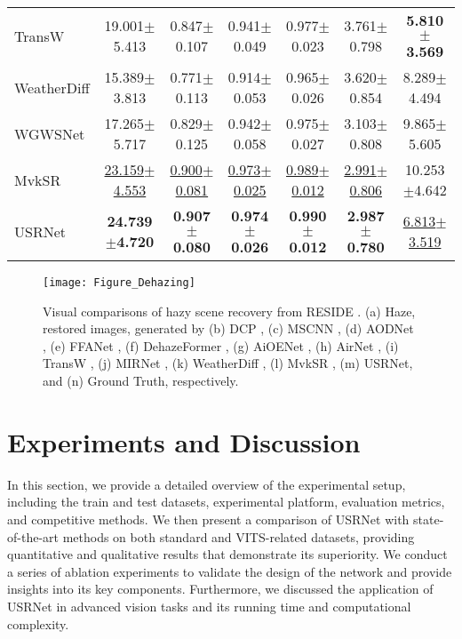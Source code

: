 \documentclass[final,12pt]{elsarticle}
\begin{document}
\begin{table}[t]
\begin{tabular}{l|cccc|cc}
        TransW \citep{valanarasu2022transweather} & 19.001$\pm$5.413 & 0.847$\pm$0.107 & 0.941$\pm$0.049 & 0.977$\pm$0.023 & 3.761$\pm$0.798 & \textbf{5.810$\pm$3.569}  \\ 
        WeatherDiff \citep{ozdenizci2023restoring}  & 15.389$\pm$3.813 & 0.771$\pm$0.113 & 0.914$\pm$0.053 & 0.965$\pm$0.026 & 3.620$\pm$0.854 & 8.289$\pm$4.494  \\ 
        WGWSNet \citep{zhu2023learning}       & 17.265$\pm$5.717 & 0.829$\pm$0.125 & 0.942$\pm$0.058 & 0.975$\pm$0.027 & 3.103$\pm$0.808 & 9.865$\pm$5.605  \\ 
        MvkSR \citep{xu2024mvksr}        & \underline{23.159$\pm$4.553} & \underline{0.900$\pm$0.081} & \underline{0.973$\pm$0.025} & \underline{0.989$\pm$0.012} & \underline{2.991$\pm$0.806} & 10.253$\pm$4.642 \\ \hline
        USRNet       & \textbf{24.739$\pm$4.720}	&\textbf{0.907$\pm$0.080}	&\textbf{0.974$\pm$0.026}	&\textbf{0.990$\pm$0.012}	&\textbf{2.987$\pm$0.780} 	&\underline{6.813$\pm$3.519}                   \\ \hline
        \end{tabular}\label{table:dehazing}
    \end{table}
    \begin{figure}[t]
        \centering
        \setlength{\abovecaptionskip}{0.cm}
        \texttt{[image: Figure\_Dehazing]}
        \caption{Visual comparisons of hazy scene recovery from RESIDE \citep{li2018benchmarking}. (a) Haze, restored images, generated by (b) DCP \citep{he2010single}, (c) MSCNN \citep{ren2016single}, (d) AODNet \citep{li2017aod}, (e) FFANet \citep{qin2020ffa}, (f) DehazeFormer \citep{song2023vision}, (g) AiOENet \citep{liu2023aioenet}, (h) AirNet \citep{li2022all}, (i) TransW \citep{valanarasu2022transweather}, (j) MIRNet \citep{zamir2022learning}, (k) WeatherDiff \citep{ozdenizci2023restoring}, (l) MvkSR \citep{xu2024mvksr}, (m) USRNet, and (n) Ground Truth, respectively.}
        \label{Figure_Dehazing}
    \end{figure}
%
\section{Experiments and Discussion}\label{sec:experiments}
%
    In this section, we provide a detailed overview of the experimental setup, including the train and test datasets, experimental platform, evaluation metrics, and competitive methods. We then present a comparison of USRNet with state-of-the-art methods on both standard and VITS-related datasets, providing quantitative and qualitative results that demonstrate its superiority. We conduct a series of ablation experiments to validate the design of the network and provide insights into its key components. Furthermore, we discussed the application of USRNet in advanced vision tasks and its running time and computational complexity.
%
\end{document}
